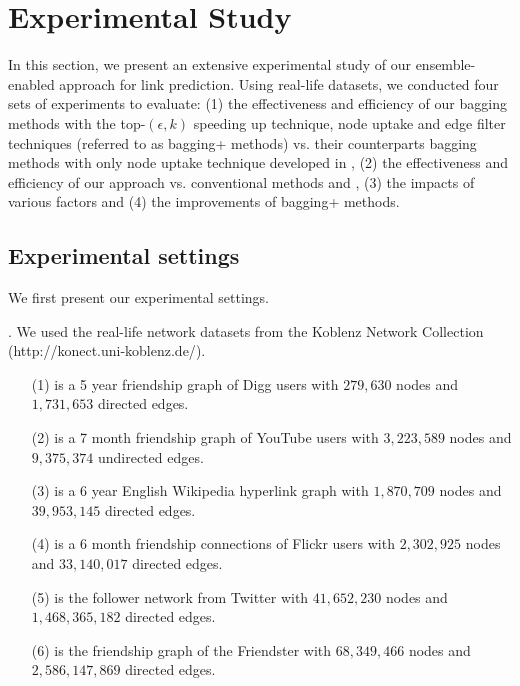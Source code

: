\section{Experimental Study}
\label{sec-exp}

In this section, we present an extensive experimental study of our ensemble-enabled approach for link prediction.
Using real-life datasets, we conducted four sets of experiments to evaluate:
(1) the effectiveness and efficiency of our bagging methods with the top-$(\epsilon, k)$ speeding up technique,
node uptake and edge filter techniques (referred to as bagging+ methods)
vs. their counterparts bagging methods with only node uptake technique developed in \cite{liang2016},
(2) the effectiveness and efficiency of our approach vs. conventional methods \Aa \cite{adamic} and \BIGCLAM \cite{yang-wsdm2013},
(3) the impacts of various factors and (4) the improvements of bagging+ methods.


\subsection{Experimental settings}

We first present our experimental settings.

. We used the real-life network datasets
from the Koblenz Network Collection ({\small http://konect.uni-koblenz.de/}).


\begin{enumerate}

\item[(1)] \Digg is a 5 year friendship graph of Digg users with
$279,630$ nodes and $1,731,653$ directed edges.

\item[(2)] \YouTube is a 7 month  friendship graph of YouTube users
with $3,223,589$ nodes and $9,375,374$ undirected edges.

\item[(3)]  \Wikipedia is a 6 year English Wikipedia hyperlink graph
with $1,870,709$ nodes and $39,953,145$ directed edges.

\item[(4)]  \Flickr is a 6 month friendship connections of Flickr users
with $2,302,925$ nodes and $33,140,017$ directed edges.

\item[(5)]  \Twitter is the follower network from Twitter with $41,652,230$ nodes
  and $1,468,365,182$ directed edges.

\item[(6)]  \Friendster is the friendship graph of the Friendster with $68,349,466$
  nodes and $2,586,147,869$ directed edges.

\end{enumerate}


